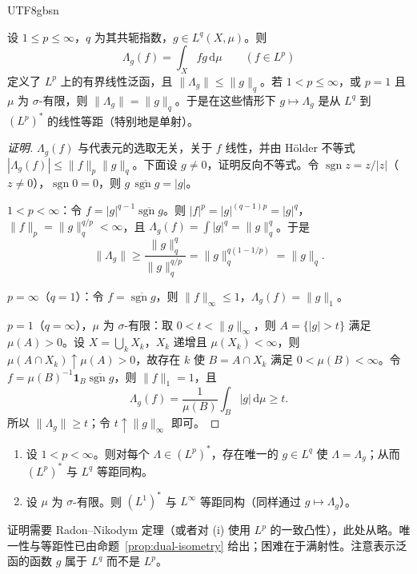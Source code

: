 \documentclass[11pt]{article}
\newcommand{\norm}[1]{\lVert #1\rVert}
\newcommand{\dmu}{\,\mathrm{d}\mu}
\newcommand{\ind}{\mathbf{1}}
\DeclareMathOperator{\sgn}{sgn}
\begin{document}
\begin{CJK*}{UTF8}{gbsn}
\begin{proposition}\label{prop:dual-isometry}
设 $1\le p\le\infty$，$q$ 为其共轭指数，$g\in L^{q}(X,\mu)$。则
\[
\Lambda_{g}(f)=\int_{X}fg\dmu\qquad(f\in L^{p})
\]
定义了 $L^{p}$ 上的有界线性泛函，且 $\norm{\Lambda_{g}}\le\norm{g}_{q}$。若 $1<p\le\infty$，或 $p=1$ 且 $\mu$ 为 $\sigma$-有限，则 $\norm{\Lambda_{g}}=\norm{g}_{q}$。于是在这些情形下 $g\mapsto\Lambda_{g}$ 是从 $L^{q}$ 到 $(L^{p})^{*}$ 的线性等距（特别地是单射）。
\end{proposition}

\begin{proof}[证明]
$\Lambda_{g}(f)$ 与代表元的选取无关，关于 $f$ 线性，并由 Hölder 不等式 $|\Lambda_{g}(f)|\le\norm{f}_{p}\norm{g}_{q}$。下面设 $g\ne0$，证明反向不等式。令 $\sgn z=z/|z|$（$z\ne0$），$\sgn0=0$，则 $g\,\overline{\sgn g}=|g|$。

$1<p<\infty$：令 $f=|g|^{q-1}\overline{\sgn g}$。则 $|f|^{p}=|g|^{(q-1)p}=|g|^{q}$，$\norm{f}_{p}=\norm{g}_{q}^{q/p}<\infty$，且 $\Lambda_{g}(f)=\int|g|^{q}=\norm{g}_{q}^{q}$。于是
\[
\norm{\Lambda_{g}}\ge\frac{\norm{g}_{q}^{q}}{\norm{g}_{q}^{q/p}}=\norm{g}_{q}^{q(1-1/p)}=\norm{g}_{q}.
\]

$p=\infty$（$q=1$）：令 $f=\overline{\sgn g}$，则 $\norm{f}_{\infty}\le1$，$\Lambda_{g}(f)=\norm{g}_{1}$。

$p=1$（$q=\infty$），$\mu$ 为 $\sigma$-有限：取 $0<t<\norm{g}_{\infty}$，则 $A=\{|g|>t\}$ 满足 $\mu(A)>0$。设 $X=\bigcup_{k}X_{k}$，$X_{k}$ 递增且 $\mu(X_{k})<\infty$，则 $\mu(A\cap X_{k})\uparrow\mu(A)>0$，故存在 $k$ 使 $B=A\cap X_{k}$ 满足 $0<\mu(B)<\infty$。令 $f=\mu(B)^{-1}\ind_{B}\overline{\sgn g}$，则 $\norm{f}_{1}=1$，且
\[
\Lambda_{g}(f)=\frac{1}{\mu(B)}\int_{B}|g|\dmu\ge t .
\]
所以 $\norm{\Lambda_{g}}\ge t$；令 $t\uparrow\norm{g}_{\infty}$ 即可。
\end{proof}

\begin{theorem}\label{thm:riesz-rep}
\begin{enumerate}
\item 设 $1<p<\infty$。则对每个 $\Lambda\in(L^{p})^{*}$，存在唯一的 $g\in L^{q}$ 使 $\Lambda=\Lambda_{g}$；从而 $(L^{p})^{*}$ 与 $L^{q}$ 等距同构。
\item 设 $\mu$ 为 $\sigma$-有限。则 $(L^{1})^{*}$ 与 $L^{\infty}$ 等距同构（同样通过 $g\mapsto\Lambda_{g}$）。
\end{enumerate}
\end{theorem}

证明需要 Radon--Nikodym 定理（或者对 (i) 使用 $L^{p}$ 的一致凸性），此处从略。唯一性与等距性已由命题~\ref{prop:dual-isometry} 给出；困难在于满射性。注意表示泛函的函数 $g$ 属于 $L^{q}$ 而不是 $L^{p}$。


\end{CJK*}
\end{document}
